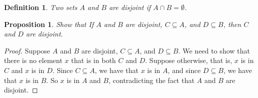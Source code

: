 \documentclass{article}
\newtheorem{proposition}[theorem]{Proposition}
\newtheorem{definition}[theorem]{Definition}
\begin{document}
\begin{definition}
Two sets $A$ and $B$ are \emph{disjoint} if $A \cap B = \emptyset$.
\end{definition}

\begin{proposition}
Show that If $A$ and $B$ are disjoint, $C \subseteq A$, and $D \subseteq B$, 
then $C$ and $D$ are disjoint. 
\end{proposition}

\begin{proof}
Suppose $A$ and $B$ are disjoint, $C \subseteq A$, and $D \subseteq B$. We need 
to show that there is no element $x$ that is in both $C$ and $D$. Suppose 
otherwise, that is, $x$ is in $C$ and $x$ is in $D$. Since $C \subseteq A$, we 
have that $x$ is in $A$, and since $D \subseteq B$, we have that $x$ is in $B$. 
So $x$ is in $A$ and $B$, contradicting the fact that $A$ and $B$ are disjoint.
\end{proof}
\end{document}
